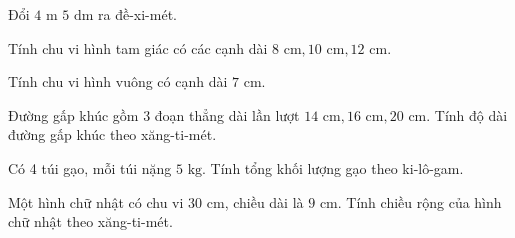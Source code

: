 \begin{ex} %
Đổi $4\text{ m } 5\text{ dm}$ ra đề-xi-mét.
\end{ex}

\begin{ex} %
Tính chu vi hình tam giác có các cạnh dài $8\text{ cm}, 10\text{ cm}, 12\text{ cm}$.
\end{ex}

\begin{ex} %
Tính chu vi hình vuông có cạnh dài $7\text{ cm}$.
\end{ex}

\begin{ex} %
Đường gấp khúc gồm 3 đoạn thẳng dài lần lượt $14\text{ cm}, 16\text{ cm}, 20\text{ cm}$. Tính độ dài đường gấp khúc theo xăng-ti-mét.
\end{ex}

\begin{ex} %
Có 4 túi gạo, mỗi túi nặng $5\text{ kg}$. Tính tổng khối lượng gạo theo ki-lô-gam.
\end{ex}

\begin{ex} %
Một hình chữ nhật có chu vi $30\text{ cm}$, chiều dài là $9\text{ cm}$. Tính chiều rộng của hình chữ nhật theo xăng-ti-mét.
\end{ex}
